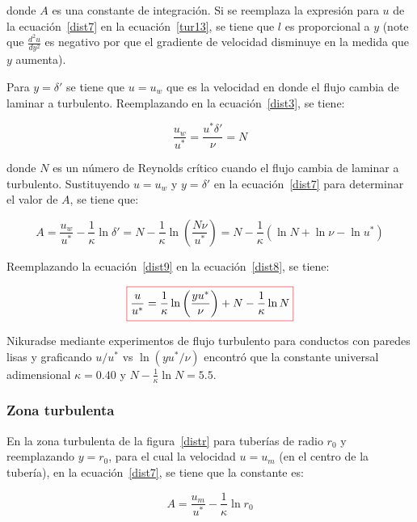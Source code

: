 \documentclass[11pt, oneside]{article}
\begin{document}
donde $A$ es una constante de integraci\'on. Si se reemplaza la expresi\'on para $u$ de la ecuaci\'on~\ref{dist7} en la ecuaci\'on~\ref{tur13}, se tiene que $l$ es proporcional a $y$ (note que $\frac{d^2 u}{dy^2}$ es negativo por que el gradiente de velocidad disminuye en la medida que $y$ aumenta). 

Para $y = \delta '$ se tiene que $u= u_w$ que es la velocidad en donde el flujo cambia de laminar a turbulento. Reemplazando en la ecuaci\'on~\ref{dist3}, se tiene:

\begin{equation}
\frac{u_w}{u^*} = \frac{u^* \delta '}{\nu} = N
\label{dist8}
\end{equation}

donde $N$ es un n\'umero de Reynolds cr\'itico cuando el flujo cambia de laminar a turbulento. Sustituyendo $u= u_w $ y $y = \delta '$ en la ecuaci\'on~\ref{dist7} para determinar el valor de $A$, se tiene que:

\begin{equation}
A = \frac{u_w }{u^* } - \frac{1}{\kappa} \ln \delta ' = N - \frac{1}{\kappa} \ln \left( \frac{N \nu}{u^*} \right) =N - \frac{1}{\kappa}  ( \ln N + \ln \nu  - \ln u^* )  
\label{dist9}
\end{equation}

Reemplazando la ecuaci\'on~\ref{dist9} en la ecuaci\'on~\ref{dist8}, se tiene:

\begin{equation}
\color{red}\boxed{\color{black} \frac{u}{u^*} = \frac{1}{\kappa} \ln \left(\frac{y u^*}{\nu}\right) + N - \frac{1}{\kappa} \ln N }
\label{dist10}
\end{equation}

Nikuradse mediante experimentos de flujo turbulento para conductos con paredes lisas y graficando $u/u^*$ vs $\ln(y u^*/ \nu )$ encontr\'o que la constante universal adimensional $\kappa = 0.40$ y  $N - \frac{1}{\kappa} \ln N  = 5.5$.

\subsubsection*{Zona turbulenta}
En la zona turbulenta de la figura~\ref{distr} para tuber\'ias de radio $r_0$ y reemplazando $y=r_0$, para el cual la velocidad $u=u_m $ (en el centro de la tuber\'ia), en la ecuaci\'on~\ref{dist7}, se tiene que la constante es:

\begin{equation}
A = \frac{u_m}{u^*} - \frac{1}{\kappa} \ln r_0
\label{dist11}
\end{equation}
\end{document}
